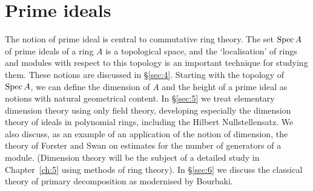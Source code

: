 \chapter{Prime ideals}\label{ch:2}

The notion of prime ideal is central to commutative ring theory. The set
$\operatorname{Spec} A$ of prime ideals of a ring $A$ is a topological space, and the
`localisation' of rings and modules with respect to this topology is an
important technique for studying them. These notions are discussed in \S\ref{sec:4}.
Starting with the topology of $\operatorname{Spec} A$, we can define the dimension of $A$ and
the height of a prime ideal as notions with natural geometrical content. In
\S\ref{sec:5} we treat elementary dimension theory using only field theory, developing
especially the dimension theory of ideals in polynomial rings, including the
Hilbert Nullstellensatz. We also discuss, as an example of an application of the
notion of dimension, the theory of Forster and Swan on estimates for the
number of generators of a module. (Dimension theory will be the subject of
a detailed study in Chapter~\ref{ch:5} using methods of ring theory). In \S\ref{sec:6} we discuss
the classical theory of primary decomposition as modernised by Bourbaki.





